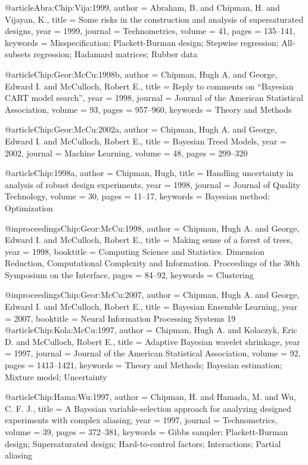 @article{Abra:Chip:Vija:1999,
    author = {Abraham, B. and Chipman, H. and Vijayan, K.},
    title = {Some risks in the construction and analysis of supersaturated designs},
    year = {1999},
    journal = {Technometrics},
    volume = {41},
    pages = {135--141},
    keywords = {Misspecification; Plackett-Burman design; Stepwise regression; All-subsets regression; Hadamard matrices; Rubber data}
}

@article{Chip:Geor:McCu:1998b,
    author = {Chipman, Hugh A. and George, Edward I. and McCulloch, Robert E.},
    title = {Reply to comments on ``{B}ayesian {CART} model search''},
    year = {1998},
    journal = {Journal of the American Statistical Association},
    volume = {93},
    pages = {957--960},
    keywords = {Theory and Methods}
}

@article{Chip:Geor:McCu:2002a,
    author = {Chipman, Hugh A. and George, Edward I. and McCulloch, Robert E.},
    title = {Bayesian Treed Models},
    year = {2002},
    journal = {Machine Learning},
    volume = {48},
    pages = {299--320}
}

@article{Chip:1998a,
    author = {Chipman, Hugh},
    title = {Handling uncertainty in analysis of robust design experiments},
    year = {1998},
    journal = {Journal of Quality Technology},
    volume = {30},
    pages = {11--17},
    keywords = {Bayesian method; Optimization}
}

@inproceedings{Chip:Geor:McCu:1998,
    author = {Chipman, Hugh A. and George, Edward I. and McCulloch, Robert E.},
    title = {Making sense of a forest of trees},
    year = {1998},
    booktitle = {Computing Science and Statistics. Dimension Reduction, Computational Complexity and Information. Proceedings of the 30th Symposium on the Interface},
    pages = {84--92},
    keywords = {Clustering}
}

@inproceedings{Chip:Geor:McCu:2007,
    author = {Chipman, Hugh A. and George, Edward I. and McCulloch, Robert E.},
    title = {Bayesian Ensemble Learning},
    year = {2007},
    booktitle = {Neural Information Processing Systems 19}
}
@article{Chip:Kola:McCu:1997,
    author = {Chipman, Hugh A. and Kolaczyk, Eric D. and McCulloch, Robert E.},
    title = {Adaptive {B}ayesian wavelet shrinkage},
    year = {1997},
    journal = {Journal of the American Statistical Association},
    volume = {92},
    pages = {1413--1421},
    keywords = {Theory and Methods; Bayesian estimation; Mixture model; Uncertainty}
}

@article{Chip:Hama:Wu:1997,
    author = {Chipman, H. and Hamada, M. and Wu, C. F. J.},
    title = {A {B}ayesian variable-selection approach for analyzing designed experiments with complex aliasing},
    year = {1997},
    journal = {Technometrics},
    volume = {39},
    pages = {372--381},
    keywords = {Gibbs sampler; Plackett-Burman design; Supersaturated design; Hard-to-control factors; Interactions; Partial aliasing}
}

